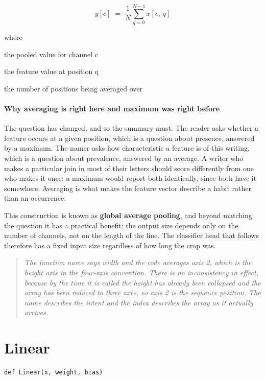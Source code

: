 \begin{equation}
y[c] \;=\; \frac{1}{N} \sum_{q=0}^{N-1} x[c,\,q]
\end{equation}

\noindent where
\begin{description}[leftmargin=2.4em,style=nextline,font=\normalfont\ttfamily]\setlength\itemsep{1pt}
  \item[{$y[c]$}] \normalfont the pooled value for channel c
  \item[{$x[c,q]$}] \normalfont the feature value at position q
  \item[{$N$}] \normalfont the number of positions being averaged over
\end{description}

\paragraph{Why averaging is right here and maximum was right before}
The question has changed, and so the summary must. The reader asks whether a feature occurs at a given position, which is a question about presence, answered by a maximum. The namer asks how characteristic a feature is of this writing, which is a question about prevalence, answered by an average. A writer who makes a particular join in most of their letters should score differently from one who makes it once; a maximum would report both identically, since both have it somewhere. Averaging is what makes the feature vector describe a habit rather than an occurrence.

This construction is known as \textbf{global average pooling}, and beyond matching the question it has a practical benefit: the output size depends only on the number of channels, not on the length of the line. The classifier head that follows therefore has a fixed input size regardless of how long the crop was.


\begin{quote}\small\itshape The function name says width and the code averages axis 2, which is the height axis in the four-axis convention. There is no inconsistency in effect, because by the time it is called the height has already been collapsed and the array has been reduced to three axes, so axis 2 is the sequence position. The name describes the intent and the index describes the array as it actually arrives.\end{quote}

\section{Linear}
\begin{lstlisting}[style=sig]
def Linear(x, weight, bias)
\end{lstlisting}

